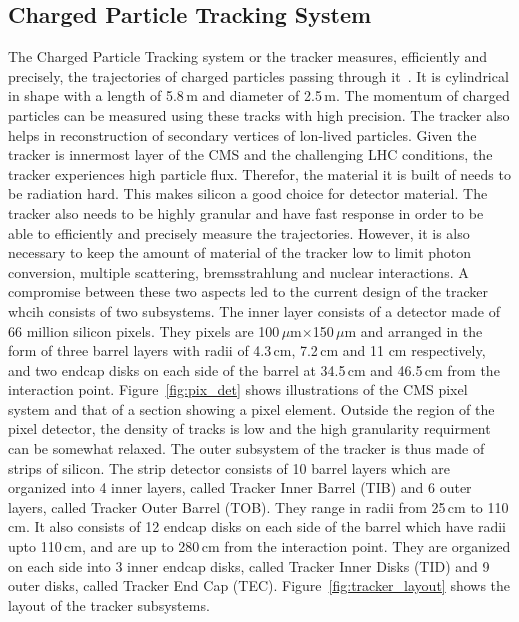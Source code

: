 \subsection{Charged Particle Tracking System}
\label{tracker}
The Charged Particle Tracking system or the tracker measures, efficiently and precisely, the trajectories of charged particles passing through it~\cite{cms_exp_ref, pix_det, pix_det2}. It is cylindrical in shape with a length of 5.8\,m and diameter of 2.5\,m. The momentum of charged particles can be measured using these tracks with high precision. The tracker also helps in reconstruction of secondary vertices of lon-lived particles. Given the tracker is innermost layer of the CMS and the challenging LHC conditions, the tracker experiences high particle flux. Therefor, the material it is built of needs to be radiation hard. This makes silicon a good choice for detector material. The tracker also needs to be highly granular and have fast response in order to be able to efficiently and precisely measure the trajectories. However, it is also necessary to keep the amount of material of the tracker low to limit photon conversion, multiple scattering, bremsstrahlung and nuclear interactions. A compromise between these two aspects led to the current design of the tracker whcih consists of two subsystems. The inner layer consists of a detector made of 66 million silicon pixels. They pixels are 100\,$\mu$m$\times$150\,$\mu$m and arranged in the form of three barrel layers with radii of 4.3\,cm, 7.2\,cm and 11 cm respectively, and two endcap disks on each side of the barrel at 34.5\,cm and 46.5\,cm from the interaction point. Figure~\ref{fig:pix_det} shows illustrations of the CMS pixel system and that of a section showing a pixel element. Outside the region of the pixel detector, the density of tracks is low and the high granularity requirment can be somewhat relaxed. The outer subsystem of the tracker is thus made of strips of silicon. The strip detector consists of 10 barrel layers which are organized into 4 inner layers, called Tracker Inner Barrel (TIB) and 6 outer layers, called Tracker Outer Barrel (TOB). They range in radii from 25\,cm to 110\,cm. It also consists of 12 endcap disks on each side of the barrel which have radii upto 110\,cm, and are up to 280\,cm from the interaction point. They are organized on each side into 3 inner endcap disks, called Tracker Inner Disks (TID) and 9 outer disks, called Tracker End Cap (TEC). Figure~\ref{fig:tracker_layout} shows the layout of the tracker subsystems.    

